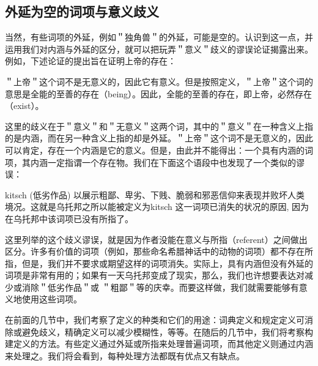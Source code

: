 \subsection{外延为空的词项与意义歧义}

当然，有些词项的外延，例如＂独角兽＂的外延，可能是空的。认识到这一点，并运用我们对内涵与外延的区分，就可以把玩弄＂意义＂歧义的谬误论证揭露出来。例如，下述论证的提出旨在证明上帝的存在：

\begin{displayquote}
＂上帝＂这个词不是无意义的，因此它有意义。但是按照定义，＂上帝＂这个词的意思是全能的至善的存在（being）。因此，全能的至善的存在，即上帝，必然存在（exist）。
\end{displayquote}

这里的歧义在于＂意义＂和＂无意义＂这两个词，其中的＂意义＂在一种含义上指的是内涵，而在另一种含义上指的却是外延。＂上帝＂这个词不是无意义的，因此可以肯定，存在一个内涵是它的意义。但是，由此并不能得出：一个具有内涵的词项，其内涵一定指谓一个存在物。\cite{gombocz1997}我们在下面这个语段中也发现了一个类似的谬误：

\begin{displayquote}
kitsch (低劣作品) 以展示粗鄙、卑劣、下贱、脆弱和邪恶信仰来表现并败坏人类境况。这就是乌托邦之所以能被定义为kitsch 这一词项已消失的状况的原因, 因为在乌托邦中该词项已没有所指了。\cite{sisk1988}
\end{displayquote}

这里列举的这个歧义谬误，就是因为作者没能在意义与所指（referent）之间做出区分。许多有价值的词项（例如，那些命名希腊神话中的动物的词项）都不存在所指，但是，我们并不要求或期望这样的词项消失。实际上，具有内涵但没有外延的词项是非常有用的；如果有一天乌托邦变成了现实，那么，我们也许想要表达对减少或消除＂低劣作品＂或 ＂粗鄙＂等的庆幸。而要这样做，我们就需要能够有意义地使用这些词项。

在前面的几节中，我们考察了定义的种类和它们的用途：词典定义和规定定义可消除或避免歧义，精确定义可以减少模糊性，等等。在随后的几节中，我们将考察构建定义的方法。有些定义通过外延或所指来处理普遍词项，而其他定义则通过内涵来处理之。我们将会看到，每种处理方法都既有优点又有缺点。

\begin{center}
\end{center} 